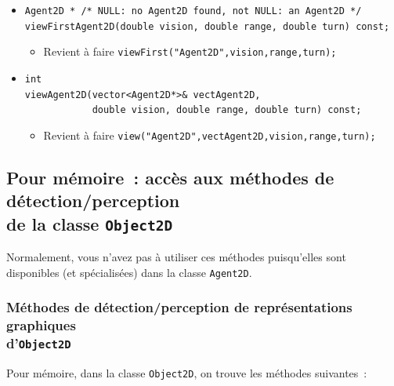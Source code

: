 \documentclass[12pt]{article}
\begin{document}
\begin{itemize}
\begin{itemize}
            En interne, il y a un {\tt getAllAgents}~!
      \end{itemize}
\vspace{-0.3cm}
\item \verb!Agent2D * /* NULL: no Agent2D found, not NULL: an Agent2D */!\\
      \verb!viewFirstAgent2D(double vision, double range, double turn) const;!
      \begin{itemize}
      \item Revient \`a faire
            {\tt viewFirst("Agent2D",vision,range,turn);}
      \end{itemize}
\vspace{-0.3cm}
\item \verb!int!\\
      \verb!viewAgent2D(vector<Agent2D*>& vectAgent2D,!\\
      \verb!            double vision, double range, double turn) const;!
      \begin{itemize}
      \item Revient \`a faire
            {\tt view("Agent2D",vectAgent2D,vision,range,turn);}
      \end{itemize}
\end{itemize}


\subsection{Pour m\'emoire~: acc\`es aux m\'ethodes de d\'etection/perception\\
de la classe {\tt Object2D}}

Normalement, vous n'avez pas \`a utiliser ces m\'ethodes puisqu'elles sont
disponibles (et sp\'ecialis\'ees) dans la classe {\tt Agent2D}.

\subsubsection{M\'ethodes de d\'etection/perception
de repr\'esentations graphiques\\d'{\tt Object2D}} 

\vspace{0.3cm}
Pour m\'emoire, dans la classe {\tt Object2D},
on trouve les m\'ethodes suivantes~:
\end{document}
